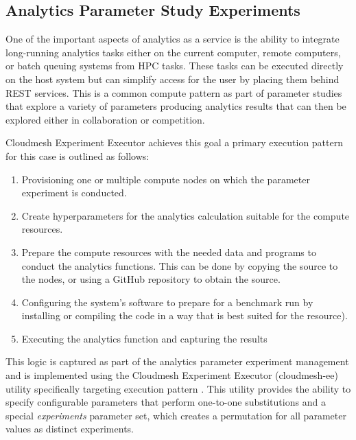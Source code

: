 \subsection{Analytics Parameter Study Experiments}

One of the important aspects of analytics as a service is the ability to integrate long-running analytics tasks either 
on the current computer, remote computers, or batch queuing systems from HPC tasks. These tasks can be 
executed directly on the host system but can simplify access for the user by placing them behind REST 
services. This is a common compute pattern as part of parameter studies that explore a variety of 
parameters producing analytics results that can then be explored either in collaboration or competition. 

Cloudmesh Experiment Executor achieves this goal a primary execution pattern for this case is outlined as follows:


\begin{enumerate}
    \item Provisioning one or multiple compute nodes on which the parameter experiment is conducted.
    \item Create hyperparameters for the analytics calculation suitable for the compute resources.
    \item Prepare the compute resources with the needed data and programs to conduct the analytics 
          functions. This can be done by copying the source to the nodes, or using a GitHub repository to 
          obtain the source.
    \item Configuring the system's software to prepare for a benchmark run by installing or compiling the code 
          in a way that is best suited for the resource).
    \item Executing the analytics function and capturing the results
\end{enumerate}

This logic is captured as part of the analytics parameter experiment management and is implemented using the Cloudmesh Experiment Executor (cloudmesh-ee) utility specifically targeting execution pattern \cite{repo-cloudmesh-ee}.
This utility provides the ability to specify configurable parameters that perform one-to-one substitutions and a special \textit{experiments} parameter set, which creates a permutation for all parameter values as distinct experiments.

